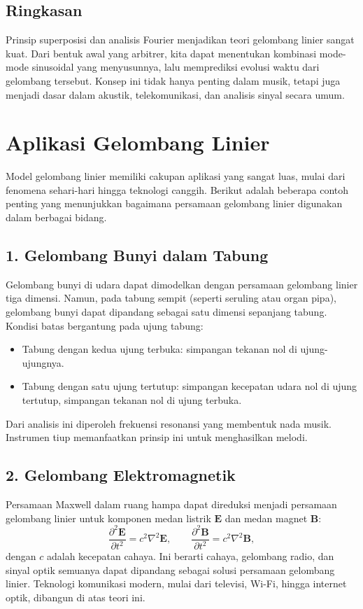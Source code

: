 \documentclass{bukumjh}
\begin{document}
\subsection*{Ringkasan}
Prinsip superposisi dan analisis Fourier menjadikan teori gelombang linier sangat kuat. 
Dari bentuk awal yang arbitrer, kita dapat menentukan kombinasi mode-mode sinusoidal yang menyusunnya, lalu memprediksi evolusi waktu dari gelombang tersebut. 
Konsep ini tidak hanya penting dalam musik, tetapi juga menjadi dasar dalam akustik, telekomunikasi, dan analisis sinyal secara umum.

\section{Aplikasi Gelombang Linier}

Model gelombang linier memiliki cakupan aplikasi yang sangat luas, mulai dari fenomena sehari-hari hingga teknologi canggih. 
Berikut adalah beberapa contoh penting yang menunjukkan bagaimana persamaan gelombang linier digunakan dalam berbagai bidang.

\subsection*{1. Gelombang Bunyi dalam Tabung}
Gelombang bunyi di udara dapat dimodelkan dengan persamaan gelombang linier tiga dimensi. 
Namun, pada tabung sempit (seperti seruling atau organ pipa), gelombang bunyi dapat dipandang sebagai satu dimensi sepanjang tabung. 
Kondisi batas bergantung pada ujung tabung:
\begin{itemize}
  \item Tabung dengan kedua ujung terbuka: simpangan tekanan nol di ujung-ujungnya.
  \item Tabung dengan satu ujung tertutup: simpangan kecepatan udara nol di ujung tertutup, simpangan tekanan nol di ujung terbuka.
\end{itemize}
Dari analisis ini diperoleh frekuensi resonansi yang membentuk nada musik. 
Instrumen tiup memanfaatkan prinsip ini untuk menghasilkan melodi.

\subsection*{2. Gelombang Elektromagnetik}
Persamaan Maxwell dalam ruang hampa dapat direduksi menjadi persamaan gelombang linier untuk komponen medan listrik $\mathbf{E}$ dan medan magnet $\mathbf{B}$:
\[
\frac{\partial^2 \mathbf{E}}{\partial t^2} = c^2 \nabla^2 \mathbf{E}, 
\qquad
\frac{\partial^2 \mathbf{B}}{\partial t^2} = c^2 \nabla^2 \mathbf{B},
\]
dengan $c$ adalah kecepatan cahaya. 
Ini berarti cahaya, gelombang radio, dan sinyal optik semuanya dapat dipandang sebagai solusi persamaan gelombang linier. 
Teknologi komunikasi modern, mulai dari televisi, Wi-Fi, hingga internet optik, dibangun di atas teori ini.
\end{document}

